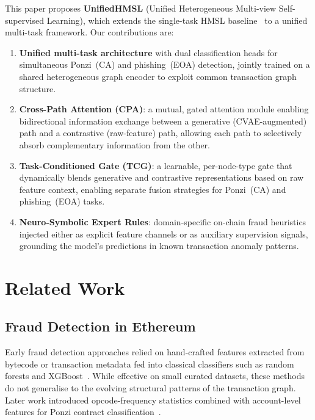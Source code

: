 \documentclass[conference]{IEEEtran}
\begin{document}
This paper proposes \textbf{UnifiedHMSL} (Unified Heterogeneous
Multi-view Self-supervised Learning), which extends the single-task
HMSL baseline~\cite{paper_baseline_2408.00641} to a unified
multi-task framework.  Our contributions are:

\begin{enumerate}
\item \textbf{Unified multi-task architecture} with dual classification
  heads for simultaneous Ponzi~(CA) and phishing~(EOA) detection,
  jointly trained on a shared heterogeneous graph encoder to exploit
  common transaction graph structure.

\item \textbf{Cross-Path Attention (CPA)}: a mutual, gated attention
  module enabling bidirectional information exchange between a
  generative (CVAE-augmented) path and a contrastive
  (raw-feature) path, allowing each path to selectively absorb
  complementary information from the other.

\item \textbf{Task-Conditioned Gate (TCG)}: a learnable,
  per-node-type gate that dynamically blends generative and
  contrastive representations based on raw feature context, enabling
  separate fusion strategies for Ponzi~(CA) and phishing~(EOA) tasks.

\item \textbf{Neuro-Symbolic Expert Rules}: domain-specific on-chain
  fraud heuristics injected either as explicit feature channels or as
  auxiliary supervision signals, grounding the model's predictions in
  known transaction anomaly patterns.
\end{enumerate}

\section{Related Work}
\label{sec:related}

\subsection{Fraud Detection in Ethereum}
Early fraud detection approaches relied on hand-crafted features
extracted from bytecode or transaction metadata fed into classical
classifiers such as random forests and XGBoost~\cite{chen2018detecting}.
While effective on small curated datasets, these methods do not
generalise to the evolving structural patterns of the transaction graph.
Later work introduced opcode-frequency statistics combined with
account-level features for Ponzi contract
classification~\cite{chen2021smartcontract}.
\end{document}
